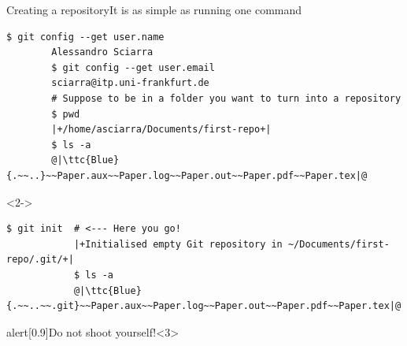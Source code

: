 \documentclass[usenames,svgnames,14pt]{beamer}
\newcommand{\ttc}[2]{\texttt{\textcolor{#1}{#2}}}
\begin{document}
\begin{frame}[fragile]{Creating a repository}{It is as simple as running one command}
    \begin{lstlisting}[style=MyBash]
        $ git config --get user.name
        Alessandro Sciarra
        $ git config --get user.email
        sciarra@itp.uni-frankfurt.de
        # Suppose to be in a folder you want to turn into a repository
        $ pwd
        |+/home/asciarra/Documents/first-repo+|
        $ ls -a
        @|\ttc{Blue}{.~~..}~~Paper.aux~~Paper.log~~Paper.out~~Paper.pdf~~Paper.tex|@
    \end{lstlisting}
    \begin{uncoverenv}<2->
        \begin{lstlisting}[style=MyBash]
            $ git init  # <--- Here you go!
            |+Initialised empty Git repository in ~/Documents/first-repo/.git/+|
            $ ls -a
            @|\ttc{Blue}{.~~..~~.git}~~Paper.aux~~Paper.log~~Paper.out~~Paper.pdf~~Paper.tex|@
        \end{lstlisting}
    \end{uncoverenv}
    \begin{varblock}{alert}[0.9\textwidth]{Do not shoot yourself!}<3>
    \end{varblock}
\end{frame}
\newcommand{\GitCommand}[6][midway]{%
    \draw[#2] ($(N#3.south)!#5!(E#3)$) -- node[#1, fill=BGLIGHT, font=\ttfamily\scriptsize] {#6} ($(N#4.south)!#5!(E#4)$);
}
\end{document}
